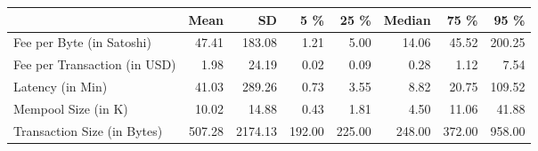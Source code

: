 \begin{tabular}{lrrrrrrr}
  \toprule
  & Mean & SD & 5 \% & 25 \% & Median & 75 \% & 95 \% \\ 
  \midrule
Fee per Byte (in Satoshi) & 47.41 & 183.08 & 1.21 & 5.00 & 14.06 & 45.52 & 200.25 \\ 
  Fee per Transaction (in USD) & 1.98 & 24.19 & 0.02 & 0.09 & 0.28 & 1.12 & 7.54 \\ 
  Latency (in Min) & 41.03 & 289.26 & 0.73 & 3.55 & 8.82 & 20.75 & 109.52 \\ 
  Mempool Size (in K) & 10.02 & 14.88 & 0.43 & 1.81 & 4.50 & 11.06 & 41.88 \\ 
  Transaction Size (in Bytes) & 507.28 & 2174.13 & 192.00 & 225.00 & 248.00 & 372.00 & 958.00 \\ 
   \bottomrule
\end{tabular}
